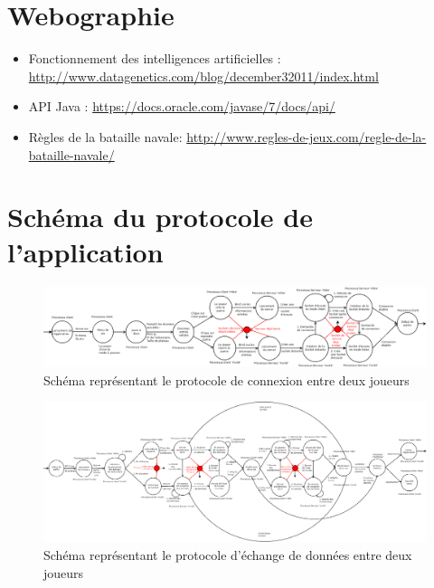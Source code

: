 \begin{appendices}
\begin{itemize}
   
\end{itemize}


\newpage
\section{Webographie}
\begin{itemize}
	\item Fonctionnement des intelligences artificielles : \url{http://www.datagenetics.com/blog/december32011/index.html}
\newline	
	\item API Java : \url{https://docs.oracle.com/javase/7/docs/api/}
	\newline
	\item Règles de la bataille navale: \url{http://www.regles-de-jeux.com/regle-de-la-bataille-navale/}
\end{itemize}

\newpage
\section{Schéma du protocole de l'application}
\begin{figure}
    \centering
    \includegraphics [width=215mm]{images/connection_between_players.png}
    \caption{Schéma représentant le protocole de connexion entre deux joueurs}
    \label{connection}
\end{figure}
\begin{figure}
    \centering
    \includegraphics [width=215mm]{images/data_exhange_between_players.png}
    \caption{Schéma représentant le protocole d'échange de données entre deux joueurs}
    \label{connection}
\end{figure}

\end{appendices}

